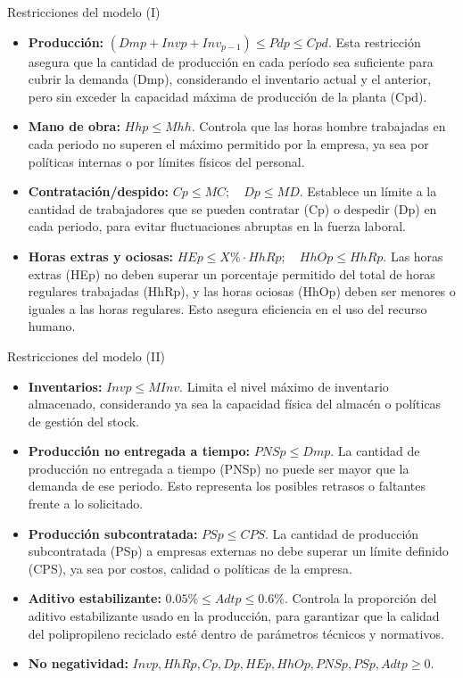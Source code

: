 \documentclass{beamer}
\begin{document}
\begin{frame}{Restricciones del modelo (I)}
\begin{itemize}
  \item \textbf{Producción:} $(Dmp + Invp + Inv_{p-1}) \leq Pdp \leq Cpd$.
  Esta restricción asegura que la cantidad de producción en cada período sea suficiente para cubrir la demanda (Dmp), considerando el inventario actual y el anterior, pero sin exceder la capacidad máxima de producción de la planta (Cpd).
  \item \textbf{Mano de obra:} $Hhp \leq Mhh$.
  Controla que las horas hombre trabajadas en cada periodo no superen el máximo permitido por la empresa, ya sea por políticas internas o por límites físicos del personal.
  \item \textbf{Contratación/despido:} $Cp \leq MC; \quad Dp \leq MD$.
  Establece un límite a la cantidad de trabajadores que se pueden contratar (Cp) o despedir (Dp) en cada periodo, para evitar fluctuaciones abruptas en la fuerza laboral.
  \item \textbf{Horas extras y ociosas:} $HEp \leq X\% \cdot HhRp; \quad HhOp \leq HhRp$.
  Las horas extras (HEp) no deben superar un porcentaje permitido del total de horas regulares trabajadas (HhRp), y las horas ociosas (HhOp) deben ser menores o iguales a las horas regulares. Esto asegura eficiencia en el uso del recurso humano.
\end{itemize}
\end{frame}

\begin{frame}{Restricciones del modelo (II)}
\begin{itemize}
  \item \textbf{Inventarios:} $Invp \leq MInv$.
  Limita el nivel máximo de inventario almacenado, considerando ya sea la capacidad física del almacén o políticas de gestión del stock.
  \item \textbf{Producción no entregada a tiempo:} $PNSp \leq Dmp$.
  La cantidad de producción no entregada a tiempo (PNSp) no puede ser mayor que la demanda de ese periodo. Esto representa los posibles retrasos o faltantes frente a lo solicitado.
  \item \textbf{Producción subcontratada:} $PSp \leq CPS$.
  La cantidad de producción subcontratada (PSp) a empresas externas no debe superar un límite definido (CPS), ya sea por costos, calidad o políticas de la empresa.
  \item \textbf{Aditivo estabilizante:} $0.05\% \leq Adtp \leq 0.6\%$.
  Controla la proporción del aditivo estabilizante usado en la producción, para garantizar que la calidad del polipropileno reciclado esté dentro de parámetros técnicos y normativos.
  \item \textbf{No negatividad:} $Invp, HhRp, Cp, Dp, HEp, HhOp, PNSp, PSp, Adtp \geq 0$.

\end{itemize}
\end{frame}
\end{document}
